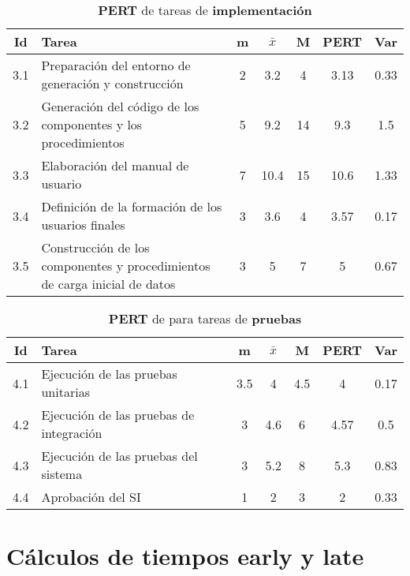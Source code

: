\documentclass[11pt,a4paper,spanish,twoside]{report}
\begin{document}
{\begin{table}[!h]
\centering
  \begin{tabular}{|c||p{5.3cm}||c|c|c||c|c|}
    \hline
    \textbf{Id} & \textbf{Tarea} & \textbf{m} & 
    \textbf{$\bar{x}$} &\textbf{M} & \textbf{PERT} & \textbf{Var}\\
    \hline \hline
    3.1 & Preparación del entorno de generación y construcción & 2 & 3.2  & 4
    & 3.13 & 0.33\\
    \hline
    3.2 & Generación del código de los componentes y los procedimientos & 5 &
    9.2 & 14 & 9.3 & 1.5\\
    \hline
    3.3 & Elaboración del manual de usuario & 7 & 10.4 & 15 & 10.6 & 1.33\\
    \hline
    3.4 & Definición de la formación de los usuarios finales & 3 & 3.6 & 4
    &3.57 & 0.17\\
    \hline
    3.5 & Construcción de los componentes y procedimientos de carga inicial
    de datos & 3 & 5 & 7 & 5 & 0.67\\
    \hline
  \end{tabular}
  \caption{\textbf{PERT} de tareas de \textbf{implementación}}
  \label{Tab:tareas3}
\end{table}

\begin{table}[!h]
\centering
  \begin{tabular}{|c||p{5.3cm}||c|c|c||c|c|}
    \hline
    \textbf{Id} & \textbf{Tarea} & \textbf{m} & 
    \textbf{$\bar{x}$} &\textbf{M} & \textbf{PERT} & \textbf{Var}\\
    \hline \hline
    4.1 & Ejecución de las pruebas unitarias & 3.5 & 4 & 4.5 & 4 & 0.17\\
    \hline
    4.2 & Ejecución de las pruebas de integración & 3 & 4.6 & 6 & 4.57 & 0.5\\
    \hline
    4.3 & Ejecución de las pruebas del sistema & 3 & 5.2 & 8 & 5.3 & 0.83\\
    \hline
    4.4 & Aprobación del SI & 1 & 2 & 3 & 2 & 0.33\\
    \hline
  \end{tabular}
  \caption{\textbf{PERT} de para tareas de \textbf{pruebas}}
  \label{Tab:tareas4}
\end{table}

\section{Cálculos de tiempos early y late}

}
\end{document}
